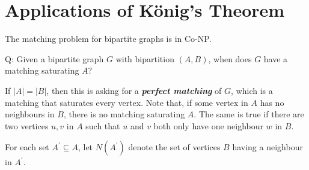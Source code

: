 \section{Applications of König's Theorem}
The matching problem for bipartite graphs is in Co-NP\@.

Q\@: Given a bipartite graph $ G $ with bipartition $ (A,B) $,
when does $ G $ have a matching saturating $ A $?

If $ |A|=|B| $, then this is asking for a \textbf{\emph{perfect matching}} of $ G $,
which is a matching that saturates every vertex. Note that,
if some vertex in $ A $ has no neighbours in $ B $, there is no matching saturating $ A $.
The same is true if there are two vertices $ u,v $ in $ A $ such that $ u $ and $ v $
both only have one neighbour $ w $ in $ B $.

For each set $ A^\prime \subseteq A $, let $ N(A^\prime) $ denote the set of vertices
$ B $ having a neighbour in $ A^\prime $.

